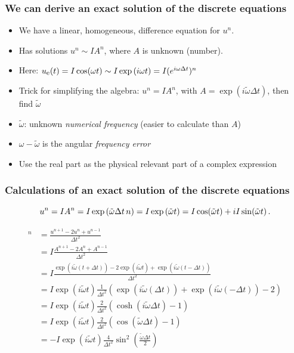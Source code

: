 \documentclass{beamer}
\begin{document}
\begin{frame}
\frametitle{We can derive an exact solution of the discrete equations}

\begin{itemize}
  \item We have a linear, homogeneous, difference equation for $u^n$.

  \item Has solutions $u^n \sim IA^n$, where $A$ is unknown (number).

  \item Here: $\uex(t) =I\cos(\omega t) \sim I\exp{(i\omega t)} = I(e^{i\omega\Delta t})^n$

  \item Trick for simplifying the algebra: $u^n = IA^n$, with $A=\exp{(i\tilde\omega\Delta t)}$, then find $\tilde\omega$

  \item $\tilde\omega$: unknown \emph{numerical frequency} (easier to calculate than $A$)

  \item $\omega - \tilde\omega$ is the angular \emph{frequency error}

  \item Use the real part as the physical relevant part of a complex expression
\end{itemize}

\noindent
\end{frame}

\begin{frame}
\frametitle{Calculations of an exact solution of the discrete equations}

\[
u^n = IA^n = I\exp{(\tilde\omega \Delta t\, n)}=I\exp{(\tilde\omega t)} =
I\cos (\tilde\omega t) + iI\sin(\tilde \omega t)
\tp
\]

\begin{align*}
[D_tD_t u]^n &= \frac{u^{n+1} - 2u^n + u^{n-1}}{\Delta t^2}\\ 
&= I\frac{A^{n+1} - 2A^n + A^{n-1}}{\Delta t^2}\\ 
&= I\frac{\exp{(i\tilde\omega(t+\Delta t))} - 2\exp{(i\tilde\omega t)} + \exp{(i\tilde\omega(t-\Delta t))}}{\Delta t^2}\\ 
&= I\exp{(i\tilde\omega t)}\frac{1}{\Delta t^2}\left(\exp{(i\tilde\omega(\Delta t))} + \exp{(i\tilde\omega(-\Delta t))} - 2\right)\\ 
&= I\exp{(i\tilde\omega t)}\frac{2}{\Delta t^2}\left(\cosh(i\tilde\omega\Delta t) -1 \right)\\ 
&= I\exp{(i\tilde\omega t)}\frac{2}{\Delta t^2}\left(\cos(\tilde\omega\Delta t) -1 \right)\\ 
&= -I\exp{(i\tilde\omega t)}\frac{4}{\Delta t^2}\sin^2(\frac{\tilde\omega\Delta t}{2})
\end{align*}
\end{frame}
\end{document}
